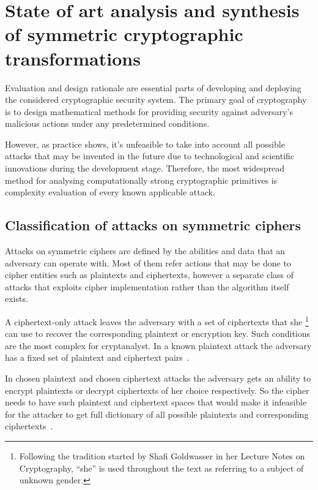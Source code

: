 %

\chapter{State of art analysis and synthesis of symmetric cryptographic transformations}
\label{sec:symmetry_review}

Evaluation and design rationale are essential parts of developing and
deploying  the considered cryptographic security system. The primary goal of
cryptography is to design mathematical methods for providing security against
adversary's malicious actions under any predetermined conditions.

However, as practice shows, it's unfeasible to take into account all possible
attacks that may be invented in the future due to technological and scientific
innovations during the development stage. Therefore, the most widespread
method for analysing computationally strong cryptographic primitives is
complexity evaluation of every known applicable attack.

\section{Classification of attacks on symmetric ciphers}

Attacks on symmetric ciphers are defined by the abilities and data
that an adversary can operate with. Most of them refer actions that may be
done to cipher entities such as plaintexts and ciphertexts, however a separate
class of attacks that exploits cipher implementation rather than the
algorithm itself exists.

A ciphertext-only attack leaves the adversary with a set of ciphertexts that
she
\footnote{Following the tradition started by Shafi Goldwasser in her Lecture
Notes on Cryptography, ``she'' is used throughout the text as referring to a
subject of unknown gender.}
can use to recover the corresponding plaintext or encryption key. Such
conditions are the most complex for cryptanalyst. In a known plaintext attack
the adversary has a fixed set of plaintext and ciphertext
pairs~\cite{menezes:applied_cryptography}.

In chosen plaintext and chosen ciphertext attacks the adversary gets an
ability to encrypt plaintexts or decrypt ciphertexts of her choice
respectively. So the cipher needs to have such plaintext and ciphertext
spaces that would make it infeasible for the attacker to get full dictionary of
all possible plaintexts and corresponding
ciphertexts~\cite{menezes:applied_cryptography}.

